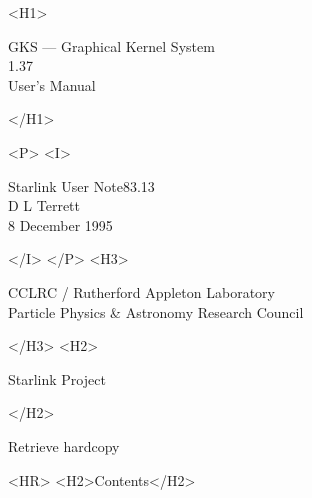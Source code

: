 \documentclass[11pt]{article}
\newcommand{\stardoccategory}  {Starlink User Note}
\newcommand{\stardocsource}    {sun83.13}
\newcommand{\stardocnumber}    {83.13}
\newcommand{\stardocauthors}   {D L Terrett}
\newcommand{\stardocdate}      {8 December 1995}
\newcommand{\stardoctitle}     {GKS --- Graphical Kernel System}
\newcommand{\stardocversion}   {1.37}
\newcommand{\stardocmanual}    {User's Manual}
\newcommand{\htmladdnormallink}[2]{#1}
\newcommand{\htmladdimg}[1]{}
\newcommand{\htmlref}[2]{#1}
\newcommand{\htmladdtonavigation}[1]{}
\newcommand{\xlabel}[1]{}
\newcommand{\latexonlytoc}[0]{\tableofcontents}
\begin{document}
\begin{htmlonly}
   \xlabel{}
   \begin{rawhtml} <H1> \end{rawhtml}
      \stardoctitle\\
      \stardocversion\\
      \stardocmanual
   \begin{rawhtml} </H1> \end{rawhtml}


   \begin{rawhtml} <P> <I> \end{rawhtml}
   \stardoccategory \stardocnumber \\
   \stardocauthors \\
   \stardocdate
   \begin{rawhtml} </I> </P> <H3> \end{rawhtml}
      \htmladdnormallink{CCLRC}{http://www.cclrc.ac.uk} /
      \htmladdnormallink{Rutherford Appleton Laboratory}
                        {http://www.cclrc.ac.uk/ral} \\
      \htmladdnormallink{Particle Physics \& Astronomy Research Council}
                        {http://www.pparc.ac.uk} \\
   \begin{rawhtml} </H3> <H2> \end{rawhtml}
      \htmladdnormallink{Starlink Project}{http://star-www.rl.ac.uk/}
   \begin{rawhtml} </H2> \end{rawhtml}
   \htmladdnormallink{\htmladdimg{source.gif} Retrieve hardcopy}
      {http://star-www.rl.ac.uk/cgi-bin/hcserver?\stardocsource}\\

  \label{stardoccontents}
  \begin{rawhtml} 
    <HR>
    <H2>Contents</H2>
  \end{rawhtml}
  \renewcommand{\latexonlytoc}[0]{}
  \htmladdtonavigation{\htmlref{\htmladdimg{contents_motif.gif}}
        {stardoccontents}}

\end{htmlonly}
\end{document}
